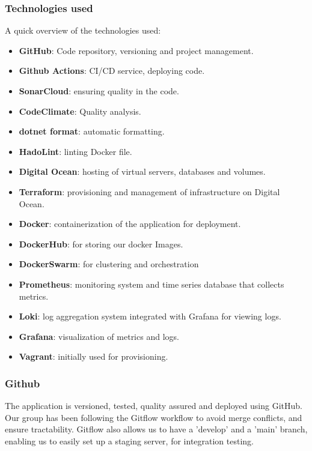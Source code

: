 \subsubsection{Technologies used}
A quick overview of the technologies used:
\begin{itemize}
    \item \textbf{GitHub}: Code repository, versioning and project management.
    \item \textbf{Github Actions}: CI/CD service, deploying code. 
    \item \textbf{SonarCloud}: ensuring quality in the code.
    \item \textbf{CodeClimate}: Quality analysis.
    \item \textbf{dotnet format}: automatic formatting.
    \item \textbf{HadoLint}: linting Docker file.
    \item \textbf{Digital Ocean}: hosting of virtual servers, databases and volumes.
    \item \textbf{Terraform}: provisioning and management of infrastructure on Digital Ocean.
    \item \textbf{Docker}: containerization of the application for deployment.
    \item \textbf{DockerHub}: for storing our docker Images. 
    \item \textbf{DockerSwarm}: for clustering and orchestration 
    \item \textbf{Prometheus}: monitoring system and time series database that collects metrics.
    \item \textbf{Loki}: log aggregation system integrated with Grafana for viewing logs.
    \item \textbf{Grafana}: visualization of metrics and logs.
    \item \textbf{Vagrant}: initially used for provisioning. 
\end{itemize} 

\newpage

\subsubsection{Github}
The application is versioned, tested, quality assured and deployed using GitHub. Our group has been following the Gitflow workflow to avoid merge conflicts, and ensure tractability. Gitflow also allows us to have a 'develop' and a 'main' branch, enabling us to easily set up a staging server, for integration testing.

